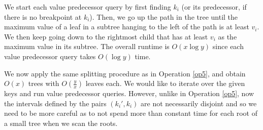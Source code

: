 \documentclass[a4paper,UKenglish]{lipics-v2016}
\theoremstyle{plain}
\begin{document}
We start each value predecessor query by first finding $k_i$ (or its predecessor, if there is no breakpoint at $k_i$). Then, we go up the path in the tree until the maximum value of a leaf in a subtree hanging to the left of the path is at least $v_i$. We then keep going down to the rightmost child that has at least $v_i$ as the maximum value in its subtree. The overall runtime is $O(x \log y)$ since each value predecessor query takes $O(\log y)$ time.

We now apply the same splitting procedure as in Operation \ref{op5}, and obtain $O(x)$ trees with $O(\frac{y}{x})$ leaves each. We would like to iterate over the given keys and run value predecessor queries. However, unlike in Operation \ref{op5}, now the intervals defined by the pairs $(k_i',k_i)$ are not necessarily disjoint and so we need to be more careful as to not spend more than constant time for each root of a small tree when we scan the roots.
\end{document}

